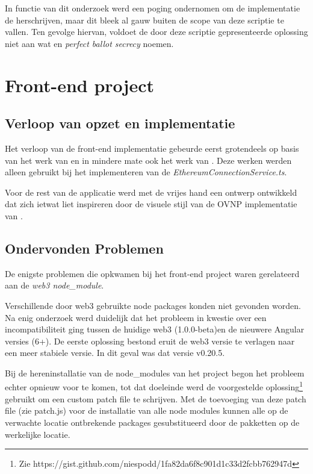 	 In functie van dit onderzoek werd een poging ondernomen om de implementatie de herschrijven, maar dit bleek al gauw buiten de scope van deze scriptie te vallen. Ten gevolge hiervan, voldoet de door deze scriptie gepresenteerde oplossing niet aan wat \textcite{McCorry2017} en \textcite{Kiayias2002} \textit{perfect ballot secrecy} noemen.

\section{Front-end project}
	\subsection{Verloop van opzet en implementatie}
	Het verloop van de front-end implementatie gebeurde eerst grotendeels op basis van het werk van \textcite{Ranjan2018} en
	in mindere mate ook het werk van \textcite{McCubin2019}. Deze werken werden alleen gebruikt bij het implementeren van de \textit{EthereumConnectionService.ts}. 
	
	Voor de rest van de applicatie werd met de vrijes hand een ontwerp ontwikkeld dat zich ietwat liet inspireren door de visuele stijl van de OVNP implementatie van \textcite{McCorry2017}.
	\subsection{Ondervonden Problemen}
	De enigste problemen die opkwamen bij het front-end project waren gerelateerd aan de \textit{web3 node\_module}. 
	
	Verschillende door web3 gebruikte node packages konden niet gevonden worden. Na enig onderzoek werd duidelijk dat het probleem in kwestie over een incompatibiliteit ging tussen de huidige web3 (1.0.0-beta)en de nieuwere Angular versies (6+). De  eerste oplossing bestond eruit de web3 versie te verlagen naar een meer stabiele versie. In dit geval was dat  versie v0.20.5. 
	
	Bij de hereninstallatie van de node\_modules van het project begon het probleem echter opnieuw voor te komen, tot dat doeleinde werd de voorgestelde oplossing\footnote{Zie https://gist.github.com/niespodd/1fa82da6f8c901d1c33d2fcbb762947d} gebruikt om een custom patch file te schrijven. Met de toevoeging van deze patch file (zie patch.js) voor de installatie van alle node modules kunnen alle op de verwachte locatie ontbrekende packages gesubstitueerd door de pakketten op de werkelijke locatie.
	
	
